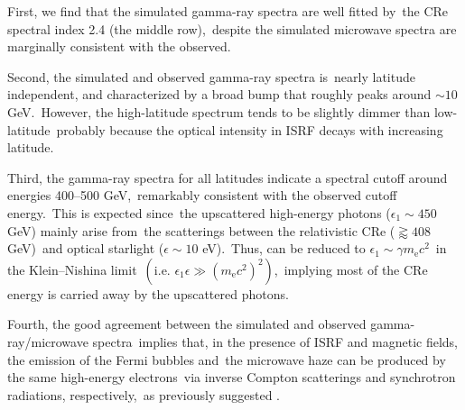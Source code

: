 \documentclass[twocolumn]{aastex631}
\begin{document}
First, we find that the simulated gamma-ray spectra are well fitted by\
the CRe spectral index 2.4 (the middle row),\
despite the simulated microwave spectra are marginally consistent with the observed.

Second, the simulated and observed gamma-ray spectra is\
nearly latitude independent, and characterized by a broad bump that roughly peaks around $\sim10$ GeV.\
However, the high-latitude spectrum tends to be slightly dimmer than low-latitude\
probably because the optical intensity in ISRF decays with increasing latitude.

Third, the gamma-ray spectra for all latitudes indicate a spectral cutoff around energies 400--500 GeV,\
remarkably consistent with the observed cutoff energy.\
This is expected since\
the upscattered high-energy photons ($\epsilon_{1}\sim450$ GeV) mainly arise from\
the scatterings between the relativistic CRe ($\gtrapprox 408$ GeV)\
and optical starlight ($\epsilon \sim 10$ eV).\
Thus,  can be reduced to $\epsilon_{1}\sim\gamma m_{\text{e}}c^2$\
in the Klein--Nishina limit\
$\left(\text{i.e. }\epsilon_{1}\epsilon \gg \left(m_{\text{e}}c^2\right)^2\right)$,\
implying most of the CRe energy is carried away by the upscattered photons.

Fourth, the good agreement between the simulated and observed gamma-ray/microwave spectra\
implies that, in the presence of ISRF and magnetic fields, the emission of the Fermi bubbles and\
the microwave haze can be produced by the same high-energy electrons\
via inverse Compton scatterings and synchrotron radiations, respectively,\
as previously suggested \citep{Su2010,Dobler2012}.
\end{document}
